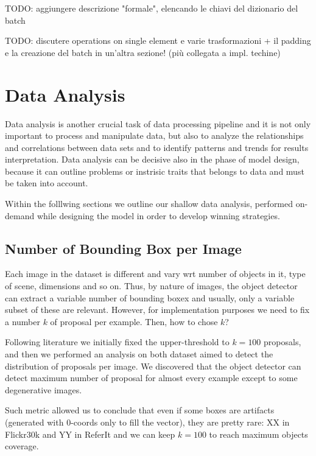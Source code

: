 TODO: aggiungere descrizione "formale", elencando le chiavi del dizionario del batch




TODO: discutere operations on single element e varie trasformazioni + il padding e la creazione del batch in un'altra sezione! (più collegata a impl. techine)

\section{Data Analysis}
\label{sec:data-analysis}

Data analysis is another crucial task of data processing pipeline and
it is not only important to process and manipulate data, but also to
analyze the relationships and correlations between data sets and to
identify patterns and trends for results interpretation.  Data analysis can be
decisive also in the phase of model design, because it can outline
problems or instrisic traits that belongs to data and must be taken
into account.

Within the folllwing sections we outline our shallow data analysis,
performed on-demand while designing the model in order to develop
winning strategies.

\subsection{Number of Bounding Box per Image}
\label{subsec:num-of-proposals}

Each image in the dataset is different and vary wrt number of objects
in it, type of scene, dimensions and so on. Thus, by nature of images,
the object detector can extract a variable number of bounding boxex
and usually, only a variable subset of these are relevant. However,
for implementation purposes we need to fix a number $k$ of proposal
per example. Then, how to chose $k$? 

Following literature we initially fixed the upper-threshold to $k =
100$ proposals, and then we performed an analysis on both dataset
aimed to detect the distribution of proposals per image. We discovered
that the object detector can detect maximum number of proposal for
almost every example except to some degenerative images.

Such metric allowed us to conclude that even if some boxes are
artifacts (generated with $0$-coords only to fill the vector), they
are pretty rare: XX in Flickr30k and YY in ReferIt 
and we can keep $k = 100$ to reach maximum objects coverage.

